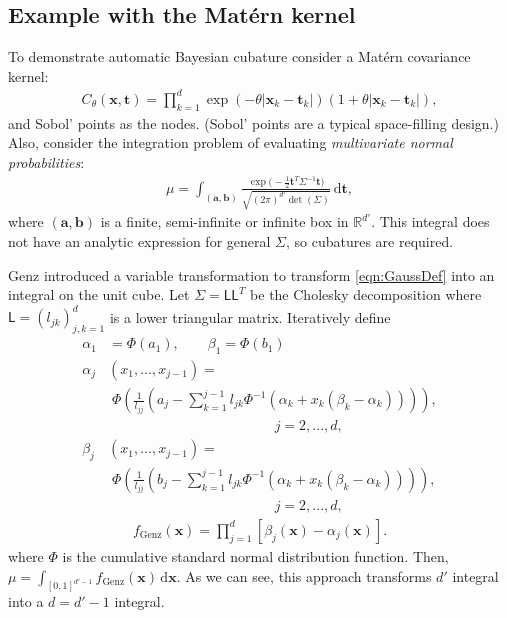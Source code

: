 \documentclass[twocolumn]{svjour3}          %
\newcommand{\bm}[1]{\boldsymbol{#1}}
\newcommand{\mSigma}{\mathsf{\Sigma}}
\newcommand{\dif}[1]{\text{d}{#1}}
\newcommand{\reals}{\mathbb{R}}
\newcommand{\va}{\bm{a}}
\newcommand{\vb}{\bm{b}}
\newcommand{\vt}{\bm{t}}
\newcommand{\vx}{\bm{x}}
\newcommand{\dvx}{\dif{\bm{x}}}
\newcommand{\dvt}{\dif{\bm{t}}}
\newcommand{\mL}{\mathsf{L}}
\begin{document}
\subsection{Example with the Mat\'ern kernel} \label{MVN_example}

To demonstrate automatic Bayesian cubature consider a Mat\'ern covariance kernel:
\begin{align*}
C_{\theta}(\vx, \vt) = \prod_{k=1}^d \exp(-\theta|\vx_k-\vt_k|)(1+\theta |\vx_k-\vt_k|),
\end{align*}
and Sobol' points as the nodes.  (Sobol' points are a typical space-filling design.)
Also, consider the integration problem of evaluating  \emph{multivariate normal probabilities}:
\begin{align}
\label{eqn:GaussDef}
\mu = \int_{(\va,\vb)} \frac{\exp\bigl(- \frac 12 \vt^T \mSigma^{-1} \vt \bigr)}{\sqrt{(2 \pi)^{d'} \det(\mSigma)}} \, \dvt,
\end{align}
where $(\va,\vb)$ is a finite, semi-infinite or infinite box in $\reals^{d'}$.  This integral does not have an analytic expression for general $\mSigma$, so cubatures are required.  

Genz \cite{Gen93} introduced a variable transformation to transform \eqref{eqn:GaussDef} into an integral on the unit cube.  Let $\mSigma= \mL \mL^T$ be the Cholesky decomposition where $\mL = (l_{jk})_{j,k=1}^d$ is a lower triangular matrix.  Iteratively define
\allowdisplaybreaks
\begin{align*}
\alpha_1& = \Phi(a_1), \qquad \beta_1 = \Phi(b_1)
\\
\alpha_j&(x_1,...,x_{j-1}) = 
\\
&\; \Phi
\left(
\frac{1}{l_{jj}} 
\left(
a_j - \sum_{k=1}^{j-1} l_{jk} \Phi^{-1}(\alpha_k + x_k(\beta_k-\alpha_k))
\right)
\right), 
\\
&\hspace{5cm} j=2,...,d,
\\
\beta_j&(x_1,...,x_{j-1}) = 
\\
&\; \Phi
\left(
\frac{1}{l_{jj}} 
\left(
b_j - \sum_{k=1}^{j-1} l_{jk} \Phi^{-1}(\alpha_k + x_k(\beta_k-\alpha_k))
\right)
\right), 
\\
&\hspace{5cm} j=2,...,d,
\end{align*}
\begin{align}
\label{fGenzdef}
f_{\text{Genz}}(\vx) = \prod_{j=1}^d [\beta_j(\vx) - \alpha_j(\vx)].
\end{align}
where $\Phi$ is the cumulative standard normal distribution function.  Then, $\mu = \int_{[0,1]^{d'-1}} f_{\text{Genz}}(\vx) \, \dvx$. As we can see, this approach transforms $d'$ integral into a $d=d'-1$ integral.
\end{document}

